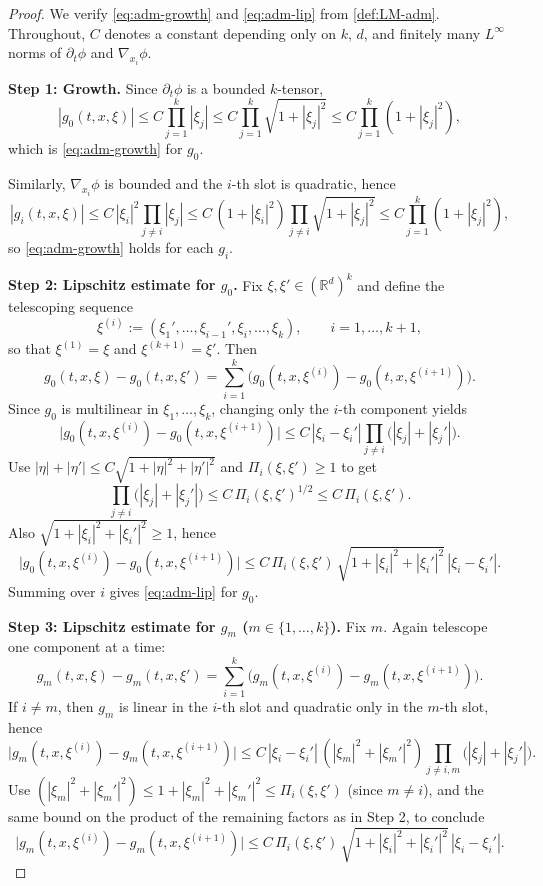 \documentclass{article}
\numberwithin{equation}{section}
\theoremstyle{plain}
\theoremstyle{definition}
\theoremstyle{remark}
\newcommand{\R}{\mathbb{R}}
\begin{document}
\begin{proof}
We verify \eqref{eq:adm-growth} and \eqref{eq:adm-lip} from \cref{def:LM-adm}.
Throughout, $C$ denotes a constant depending only on $k$, $d$, and finitely many $L^\infty$ norms of
$\partial_t\phi$ and $\nabla_{x_i}\phi$.

\smallskip
\noindent\textbf{Step 1: Growth.}
Since $\partial_t\phi$ is a bounded $k$-tensor,
\[
|g_0(t,x,\xi)|
\le C\prod_{j=1}^k |\xi_j|
\le C\prod_{j=1}^k \sqrt{1+|\xi_j|^2}
\le C\prod_{j=1}^k (1+|\xi_j|^2),
\]
which is \eqref{eq:adm-growth} for $g_0$.

Similarly, $\nabla_{x_i}\phi$ is bounded and the $i$-th slot is quadratic, hence
\[
|g_i(t,x,\xi)|
\le C\,|\xi_i|^2\prod_{j\ne i}|\xi_j|
\le C\,(1+|\xi_i|^2)\prod_{j\ne i}\sqrt{1+|\xi_j|^2}
\le C\prod_{j=1}^k(1+|\xi_j|^2),
\]
so \eqref{eq:adm-growth} holds for each $g_i$.

\smallskip
\noindent\textbf{Step 2: Lipschitz estimate for $g_0$.}
Fix $\xi,\xi'\in(\R^d)^k$ and define the telescoping sequence
\[
\xi^{(i)}:=(\xi_1',\dots,\xi_{i-1}',\xi_i,\dots,\xi_k),
\qquad i=1,\dots,k+1,
\]
so that $\xi^{(1)}=\xi$ and $\xi^{(k+1)}=\xi'$.
Then
\[
g_0(t,x,\xi)-g_0(t,x,\xi')
=\sum_{i=1}^k\bigl(g_0(t,x,\xi^{(i)})-g_0(t,x,\xi^{(i+1)})\bigr).
\]
Since $g_0$ is multilinear in $\xi_1,\dots,\xi_k$, changing only the $i$-th component yields
\[
\bigl|g_0(t,x,\xi^{(i)})-g_0(t,x,\xi^{(i+1)})\bigr|
\le C\,|\xi_i-\xi_i'|\prod_{j\ne i}\bigl(|\xi_j|+|\xi_j'|\bigr).
\]
Use $|\eta|+|\eta'|\le C\sqrt{1+|\eta|^2+|\eta'|^2}$ and $\Pi_i(\xi,\xi')\ge 1$ to get
\[
\prod_{j\ne i}\bigl(|\xi_j|+|\xi_j'|\bigr)
\le C\,\Pi_i(\xi,\xi')^{1/2}
\le C\,\Pi_i(\xi,\xi').
\]
Also $\sqrt{1+|\xi_i|^2+|\xi_i'|^2}\ge 1$, hence
\[
\bigl|g_0(t,x,\xi^{(i)})-g_0(t,x,\xi^{(i+1)})\bigr|
\le
C\,\Pi_i(\xi,\xi')\,\sqrt{1+|\xi_i|^2+|\xi_i'|^2}\,|\xi_i-\xi_i'|.
\]
Summing over $i$ gives \eqref{eq:adm-lip} for $g_0$.

\smallskip
\noindent\textbf{Step 3: Lipschitz estimate for $g_m$ ($m\in\{1,\dots,k\}$).}
Fix $m$. Again telescope one component at a time:
\[
g_m(t,x,\xi)-g_m(t,x,\xi')
=\sum_{i=1}^k\bigl(g_m(t,x,\xi^{(i)})-g_m(t,x,\xi^{(i+1)})\bigr).
\]
If $i\ne m$, then $g_m$ is linear in the $i$-th slot and quadratic only in the $m$-th slot, hence
\[
\bigl|g_m(t,x,\xi^{(i)})-g_m(t,x,\xi^{(i+1)})\bigr|
\le C\,|\xi_i-\xi_i'|\,(|\xi_m|^2+|\xi_m'|^2)\!\!\prod_{j\ne i,m}\bigl(|\xi_j|+|\xi_j'|\bigr).
\]
Use $(|\xi_m|^2+|\xi_m'|^2)\le 1+|\xi_m|^2+|\xi_m'|^2\le \Pi_i(\xi,\xi')$ (since $m\ne i$),
and the same bound on the product of the remaining factors as in Step 2, to conclude
\[
\bigl|g_m(t,x,\xi^{(i)})-g_m(t,x,\xi^{(i+1)})\bigr|
\le
C\,\Pi_i(\xi,\xi')\,\sqrt{1+|\xi_i|^2+|\xi_i'|^2}\,|\xi_i-\xi_i'|.
\]


\end{proof}
\end{document}
